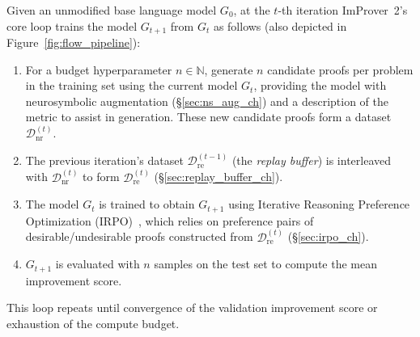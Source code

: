 Given an unmodified base language model $G_0$, at the $t$-th iteration ImProver~2's core loop trains the model $G_{t+1}$ from $G_t$ as follows (also depicted in Figure~\ref{fig:flow_pipeline}):

\begin{enumerate}
    \item For a budget hyperparameter $n \in \mathbb{N}$, generate $n$ candidate proofs per problem in the training set using the current model $G_t$, providing the model with neurosymbolic augmentation (\S\ref{sec:ns_aug_ch}) and a description of the metric to assist in generation. These new candidate proofs form a dataset $\mathcal{D}^{(t)}_{\mathrm{nr}}$.

    \item The previous iteration's dataset $\mathcal{D}^{(t-1)}_{\mathrm{re}}$ (the \textit{replay buffer}) is interleaved with $\mathcal{D}^{(t)}_{\mathrm{nr}}$ to form $\mathcal{D}^{(t)}_{\mathrm{re}}$ (\S\ref{sec:replay_buffer_ch}).

    \item The model $G_t$ is trained to obtain $G_{t+1}$ using Iterative Reasoning Preference Optimization (IRPO)~\cite{IRPO}, which relies on preference pairs of desirable/undesirable proofs constructed from $\mathcal{D}^{(t)}_{\mathrm{re}}$ (\S\ref{sec:irpo_ch}).

    \item $G_{t+1}$ is evaluated with $n$ samples on the test set to compute the mean improvement score.
\end{enumerate}

This loop repeats until convergence of the validation improvement score or exhaustion of the compute budget.


